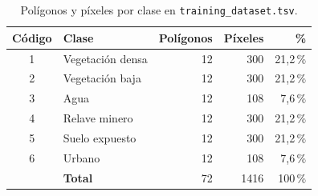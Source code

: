 \begin{table}[htbp]
 \centering
 \caption{Polígonos y píxeles por clase en \texttt{training\_dataset.tsv}.}
 \label{tab:conteo}
 \begin{tabular}{clrrr}
  \toprule
  Código & Clase & Polígonos & Píxeles & \% \\
  \midrule
  1 & Vegetación densa & 12 & 300 & 21{,}2\,\% \\
  2 & Vegetación baja & 12 & 300 & 21{,}2\,\% \\
  3 & Agua & 12 & 108 & 7{,}6\,\% \\
  4 & Relave minero & 12 & 300 & 21{,}2\,\% \\
  5 & Suelo expuesto & 12 & 300 & 21{,}2\,\% \\
  6 & Urbano & 12 & 108 & 7{,}6\,\% \\
  \midrule
   & \textbf{Total} & 72 & 1416 & 100\,\% \\
  \bottomrule
 \end{tabular}
\end{table}

